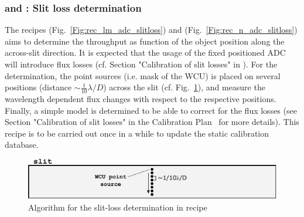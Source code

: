 \clearpage
\subsubsection{ and : Slit loss determination }\label{sssec:adc_slitlosses}
The recipes  (Fig.~\ref{Fig:rec_lm_adc_slitloss}) and  (Fig.~\ref{Fig:rec_n_adc_slitloss}) aims to determine the throughput as function of the object position along the across-slit direction. It is expected that the usage of the fixed positioned \ac{ADC} will introduce flux losses (cf. Section "Calibration of slit losses" in  \cite{METIS-calibration_plan}). For the determination, the point sources (i.e. mask of the \ac{WCU}) is placed on several positions (distance $\sim\frac{1}{10}\lambda/D$) across the slit (cf. Fig.~\ref{Fig:slitloss}), and measure the wavelength dependent flux changes with respect to the respective positions. Finally, a simple model is determined to be able to correct for the flux losses  (see Section "Calibration of slit losses" in the Calibration Plan~\cite{METIS-calibration_plan} for more details). This recipe is to be carried out once in a while to update the static calibration database.
\begin{figure}[ht]
  \centering
  \includegraphics[width=0.5\textheight]{figures/slitloss_det.pdf}
  \caption[slitloss determination]{Algorithm for the slit-loss determination in recipe  }
  \label{Fig:slitloss}
\end{figure}

